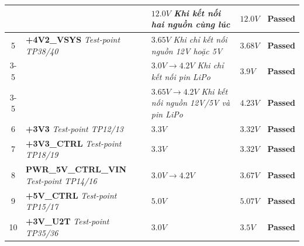 \begin{longtable}{|c|p{5cm}|p{4.5cm}|p{2.5cm}|c|}
              &  &  $12.0 V$ \newline \textit{Khi kết nối hai nguồn cùng lúc} & $12.0 V$ & \textcolor{modern_blue}{\textbf{Passed}} \\ \hline
            
            5 & \textbf{+4V2\_VSYS} \newline \textit{Test-point TP38/40} & $3.65 V$ \newline \textit{Khi chỉ kết nối nguồn 12V hoặc 5V} & $3.68 V$ & \textcolor{modern_blue}{\textbf{Passed}} \\ \cline{3-5}
            
              &  &  $3.0 V \rightarrow 4.2 V$ \newline \textit{Khi chỉ kết nối pin LiPo} & $3.9 V$ & \textcolor{modern_blue}{\textbf{Passed}} \\ \cline{3-5}
            
              &  &  $3.65 V \rightarrow 4.2 V$ \newline \textit{Khi kết nối nguồn 12V/5V và pin LiPo} & $4.23 V$ & \textcolor{modern_blue}{\textbf{Passed}} \\ \hline
            
            6 & \textbf{+3V3} \newline \textit{Test-point TP12/13} & $3.3 V$ & $3.32 V$ & \textcolor{modern_blue}{\textbf{Passed}} \\ \hline
            
            7 & \textbf{+3V3\_CTRL} \newline \textit{Test-point TP18/19} & $3.3 V$ & $3.32 V$ & \textcolor{modern_blue}{\textbf{Passed}} \\ \hline
            
            8 & \textbf{PWR\_5V\_CTRL\_VIN} \newline \textit{Test-point TP14/16} & $3.0 V \rightarrow 4.2 V$ & $3.67 V$ & \textcolor{modern_blue}{\textbf{Passed}} \\ \hline
            
            9 & \textbf{+5V\_CTRL} \newline \textit{Test-point TP15/17} & $5.0 V$ & $5.07 V$ & \textcolor{modern_blue}{\textbf{Passed}} \\ \hline
            
            10 & \textbf{+3V\_U2T} \newline \textit{Test-point TP35/36} & $3.0 V$ & $3.5 V$ & \textcolor{modern_blue}{\textbf{Passed}} \\ \hline
            

\end{longtable}
